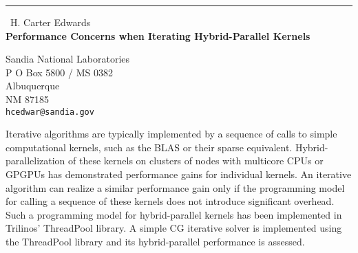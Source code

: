 \documentclass{report}
\begin{document}
\begin{center}
\rule{6in}{1pt} \
{\large H. Carter Edwards \\
{\bf Performance Concerns when Iterating Hybrid-Parallel Kernels}}

Sandia National Laboratories \\ P O Box 5800 / MS 0382 \\ Albuquerque \\ NM 87185
\\
{\tt hcedwar@sandia.gov}\end{center}

Iterative algorithms are typically implemented by a sequence of calls to
simple computational kernels, such as the BLAS or their sparse
equivalent. Hybrid-parallelization of these kernels on clusters of nodes
with multicore CPUs or GPGPUs has demonstrated performance gains for
individual kernels. An iterative algorithm can realize a similar
performance gain only if the programming model for calling a sequence of
these kernels does not introduce significant overhead. Such a programming
model for hybrid-parallel kernels has been implemented in Trilinos'
ThreadPool library. A simple CG iterative solver is implemented using the
ThreadPool library and its hybrid-parallel performance is assessed.
\end{document}

